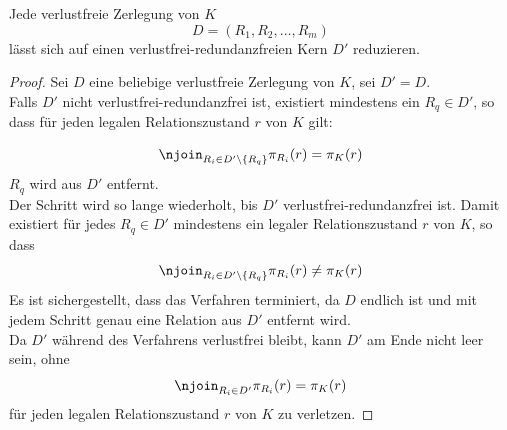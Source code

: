 \begin{lemma}\label{lem:verlustfrei_redundanzfrei_k}
    Jede verlustfreie Zerlegung von $K$
    \[
        D = (R_{1}, R_{2}, \ldots, R_{m})
    \]
    lässt sich auf einen verlustfrei-redundanzfreien Kern $D'$ reduzieren.
\end{lemma}
\begin{proof}
    Sei $D$ eine beliebige verlustfreie Zerlegung von $K$, sei $D' = D$.\\

    Falls $D'$ nicht verlustfrei-redundanzfrei ist, existiert mindestens ein $R_{q} \in D'$, so dass für jeden legalen Relationszustand $r$ von $K$ gilt:

    \[
        \njoin_{R_{i} \in D' \setminus \{R_{q}\}} \pi_{R_{i}}(r) = \pi_{K}(r)
    \]
    $R_{q}$ wird aus $D'$ entfernt.\\
    Der Schritt wird so lange wiederholt, bis $D'$ verlustfrei-redundanzfrei ist.
    Damit existiert für jedes $R_{q} \in D'$ mindestens ein legaler Relationszustand $r$ von $K$, so dass
    \[
        \njoin_{R_{i} \in D' \setminus \{R_{q}\}} \pi_{R_{i}}(r) \neq \pi_{K}(r)
    \]
    Es ist sichergestellt, dass das Verfahren terminiert, da $D$ endlich ist und mit jedem Schritt genau eine Relation aus $D'$ entfernt wird.\\

    \noindent
    Da $D'$ während des Verfahrens verlustfrei bleibt, kann $D'$ am Ende nicht leer sein, ohne
    \[
        \njoin_{R_{i} \in D'} \pi_{R_{i}}(r) = \pi_{K}(r)
    \]
    für jeden legalen Relationszustand $r$ von $K$ zu verletzen.

\end{proof}
\bigskip


